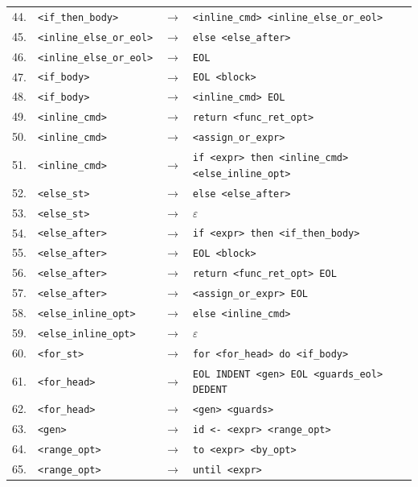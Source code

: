 {\begin{longtable}{rlcl}
44. & \texttt{<if\_then\_body>} & $\rightarrow$ & \texttt{<inline\_cmd> <inline\_else\_or\_eol>} \\
45. & \texttt{<inline\_else\_or\_eol>} & $\rightarrow$ & \texttt{else <else\_after>} \\
46. & \texttt{<inline\_else\_or\_eol>} & $\rightarrow$ & \texttt{EOL} \\
47. & \texttt{<if\_body>} & $\rightarrow$ & \texttt{EOL <block>} \\
48. & \texttt{<if\_body>} & $\rightarrow$ & \texttt{<inline\_cmd> EOL} \\
49. & \texttt{<inline\_cmd>} & $\rightarrow$ & \texttt{return <func\_ret\_opt>} \\
50. & \texttt{<inline\_cmd>} & $\rightarrow$ & \texttt{<assign\_or\_expr>} \\
51. & \texttt{<inline\_cmd>} & $\rightarrow$ & \texttt{if <expr> then <inline\_cmd> <else\_inline\_opt>} \\
52. & \texttt{<else\_st>} & $\rightarrow$ & \texttt{else <else\_after>} \\
53. & \texttt{<else\_st>} & $\rightarrow$ & $\varepsilon$ \\
54. & \texttt{<else\_after>} & $\rightarrow$ & \texttt{if <expr> then <if\_then\_body>} \\
55. & \texttt{<else\_after>} & $\rightarrow$ & \texttt{EOL <block>} \\
56. & \texttt{<else\_after>} & $\rightarrow$ & \texttt{return <func\_ret\_opt> EOL} \\
57. & \texttt{<else\_after>} & $\rightarrow$ & \texttt{<assign\_or\_expr> EOL} \\
58. & \texttt{<else\_inline\_opt>} & $\rightarrow$ & \texttt{else <inline\_cmd>} \\
59. & \texttt{<else\_inline\_opt>} & $\rightarrow$ & $\varepsilon$ \\
60. & \texttt{<for\_st>} & $\rightarrow$ & \texttt{for <for\_head> do <if\_body>} \\
61. & \texttt{<for\_head>} & $\rightarrow$ & \texttt{EOL INDENT <gen> EOL <guards\_eol> DEDENT} \\
62. & \texttt{<for\_head>} & $\rightarrow$ & \texttt{<gen> <guards>} \\
63. & \texttt{<gen>} & $\rightarrow$ & \texttt{id <- <expr> <range\_opt>} \\
64. & \texttt{<range\_opt>} & $\rightarrow$ & \texttt{to <expr> <by\_opt>} \\
65. & \texttt{<range\_opt>} & $\rightarrow$ & \texttt{until <expr>} \\

\end{longtable}}

